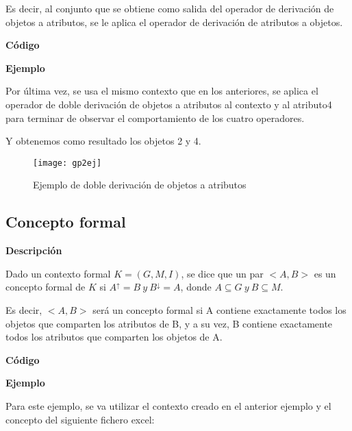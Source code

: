         Es decir, al conjunto que se obtiene como salida del operador de derivaci\'on de objetos a atributos, se le aplica el operador 
        de derivaci\'on de atributos a objetos.

        \clearpage

        \textbf{C\'odigo}

        

        \bigskip

        \textbf{Ejemplo}

        Por \'ultima vez, se usa el mismo contexto que en los anteriores, se aplica el operador de doble derivaci\'on de 
        objetos a atributos al contexto y al atributo4 para terminar de observar el comportamiento de los cuatro operadores.

        Y obtenemos como resultado los objetos 2 y 4.

        \begin{figure}[H]
            \centering
            \texttt{[image: gp2ej]}
            \caption{Ejemplo de doble derivaci\'on de objetos a atributos}
            \label{fig:gp2ej}
        \end{figure}



    \subsection{Concepto formal}

    
        \textbf{Descripci\'on}

        Dado un contexto formal \( K = (G, M, I) \), se dice que un par \( <A,B> \) es un 
        concepto formal de \(K\) si \( A^\uparrow = B ~ y ~ B^\downarrow = A\), donde \( A \subseteq G ~ y ~ B \subseteq M \).
        
        Es decir, \( <A,B> \) ser\'a un concepto formal si A contiene exactamente todos los objetos que comparten los atributos de B, y a su 
        vez, B contiene exactamente todos los atributos que comparten los objetos de A.
        \\

        \clearpage

        \textbf{C\'odigo}

        

        \bigskip

        \textbf{Ejemplo}

        Para este ejemplo, se va utilizar el contexto creado en el anterior ejemplo y el concepto del siguiente fichero excel:

